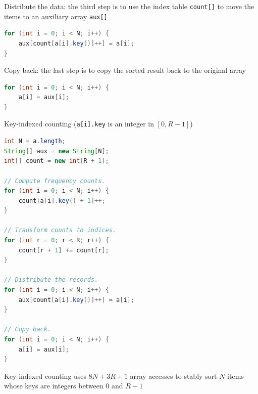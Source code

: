 \documentclass[8pt,a4paper,compress]{beamer}
\begin{document}
\begin{frame}[fragile]
\pause

Distribute the data: the third step is to use the index table \lstinline{count[]} to move the items to an auxiliary array \lstinline{aux[]}

\begin{lstlisting}[language=Java]
for (int i = 0; i < N; i++) {
    aux[count[a[i].key()]++] = a[i];
}
\end{lstlisting}

\begin{center}
\end{center}

\pause
\bigskip

Copy back: the last step is to copy the sorted result back to the original array

\begin{lstlisting}[language=Java]
for (int i = 0; i < N; i++) {
    a[i] = aux[i];
}
\end{lstlisting}
\end{frame}

\begin{frame}[fragile]
\pause

Key-indexed counting (\lstinline{a[i].key} is an integer in $[0, R-1]$)
\begin{lstlisting}[language=Java]
int N = a.length;
String[] aux = new String[N];
int[] count = new int[R + 1];

// Compute frequency counts.
for (int i = 0; i < N; i++) { 
    count[a[i].key() + 1]++;
}

// Transform counts to indices.
for (int r = 0; r < R; r++) {
    count[r + 1] += count[r];
}

// Distribute the records.
for (int i = 0; i < N; i++) {
    aux[count[a[i].key()]++] = a[i];
}

// Copy back.
for (int i = 0; i < N; i++) {
    a[i] = aux[i];
}
\end{lstlisting}

\pause
\bigskip

Key-indexed counting uses $8N + 3R + 1$ array accesses to stably
sort $N$ items whose keys are integers between 0 and $R - 1$
\end{frame}
\end{document}
